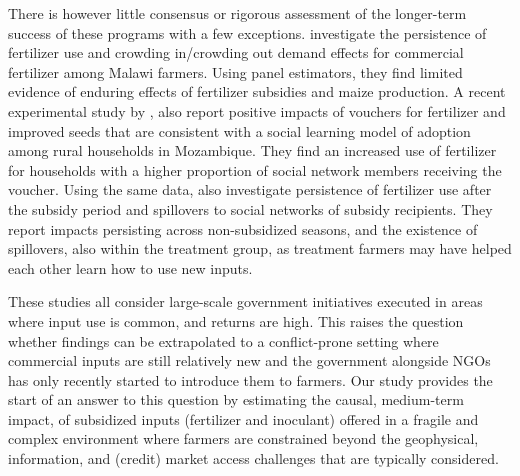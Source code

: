 There is however little consensus or rigorous assessment of the longer-term success of these programs \citep[see][for recent syntheses on the evidence]{Morris2007,Druilhe2012,Jayne2013,Jayne2018} with a few exceptions. \cite{Ricker-Gilbert2017} investigate the persistence of fertilizer use and crowding in/crowding out demand effects for commercial fertilizer among Malawi farmers. Using panel estimators, they find limited evidence of enduring effects of fertilizer subsidies and maize production. A recent experimental study by \cite{Carter2014}, also report positive impacts of vouchers for fertilizer and improved seeds that are consistent with a social learning model of adoption among rural households in Mozambique. They find an increased use of fertilizer for households with a higher proportion of social network members receiving the voucher. Using the same data, \cite{Carter2019}
also investigate persistence of fertilizer use after the subsidy period and spillovers to social networks of subsidy recipients. They report impacts persisting across non-subsidized seasons, and the existence of spillovers, also within the treatment group, as treatment farmers may have helped each other learn how to use new inputs. 

These studies all consider large-scale government initiatives executed in areas where input use is common, and returns are high. This raises the question whether findings can be extrapolated to a conflict-prone setting where commercial inputs are still relatively new and the government alongside NGOs has only recently started to introduce them to farmers. Our study provides the start of an answer to this question by estimating the causal, medium-term impact, of subsidized inputs (fertilizer and inoculant) offered in a fragile and complex environment where farmers are constrained beyond the geophysical, information, and (credit) market access challenges that are typically considered.   

